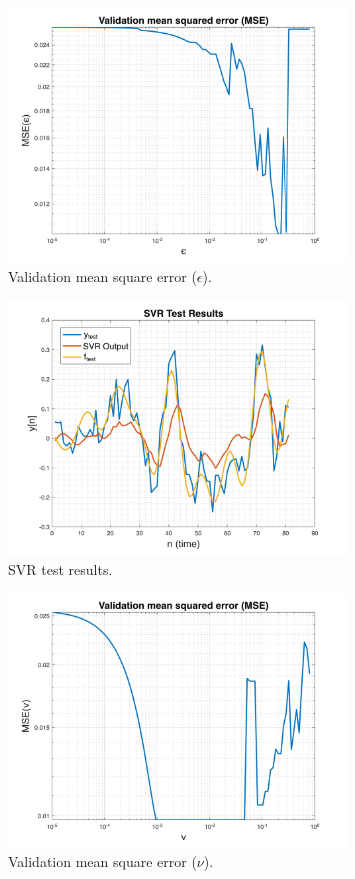 \documentclass[11pt]{article}
\begin{document}
\begin{figure}[h!]
    \centering
    \includegraphics[width=0.8\textwidth]{figure_2.png}
    \vspace{-1em}\caption{Validation mean square error (\(\epsilon\)).}
\end{figure}

\begin{figure}[h!]
    \centering
    \includegraphics[width=0.8\textwidth]{figure_3.png}
    \vspace{-1em}\caption{SVR test results.}
\end{figure}

\begin{figure}[h!]
    \centering
    \includegraphics[width=0.8\textwidth]{figure_4.png}
    \vspace{-1em}\caption{Validation mean square error (\(\nu\)).}
\end{figure}
\end{document}
